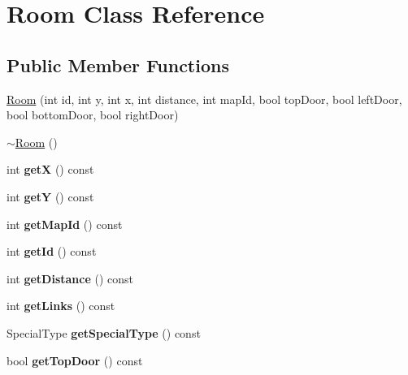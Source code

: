 \hypertarget{class_room}{\section{Room Class Reference}
\label{class_room}
}
\subsection*{Public Member Functions}
\begin{DoxyCompactItemize}
\item 
\hyperlink{class_room_af5c220386a83d7426d9da237290d53eb}{Room} (int id, int y, int x, int distance, int map\+Id, bool top\+Door, bool left\+Door, bool bottom\+Door, bool right\+Door)
\item 
\hyperlink{class_room_a67d5da09983cc53097807fd43ba5481a}{$\sim$\+Room} ()
\item 
\hypertarget{class_room_a067f0dbf1e1981f3f53692c454032bad}{int {\bfseries get\+X} () const }\label{class_room_a067f0dbf1e1981f3f53692c454032bad}

\item 
\hypertarget{class_room_a36707f281040aa8d27f13070b1a35b20}{int {\bfseries get\+Y} () const }\label{class_room_a36707f281040aa8d27f13070b1a35b20}

\item 
\hypertarget{class_room_ad36e96122696a31eec31a52ac99c4a4b}{int {\bfseries get\+Map\+Id} () const }\label{class_room_ad36e96122696a31eec31a52ac99c4a4b}

\item 
\hypertarget{class_room_a6f71af918166e1835662982219559d29}{int {\bfseries get\+Id} () const }\label{class_room_a6f71af918166e1835662982219559d29}

\item 
\hypertarget{class_room_a977bd80b8c374edb31eb467d191b7233}{int {\bfseries get\+Distance} () const }\label{class_room_a977bd80b8c374edb31eb467d191b7233}

\item 
\hypertarget{class_room_a63e8fe415cd7f3e7f327bf7603388638}{int {\bfseries get\+Links} () const }\label{class_room_a63e8fe415cd7f3e7f327bf7603388638}

\item 
\hypertarget{class_room_a97488664cbabc4cef3a63d18526b5fc0}{Special\+Type {\bfseries get\+Special\+Type} () const }\label{class_room_a97488664cbabc4cef3a63d18526b5fc0}

\item 
\hypertarget{class_room_ad490b94e5406c002c875b4a507674008}{bool {\bfseries get\+Top\+Door} () const }\label{class_room_ad490b94e5406c002c875b4a507674008}


\end{DoxyCompactItemize}

